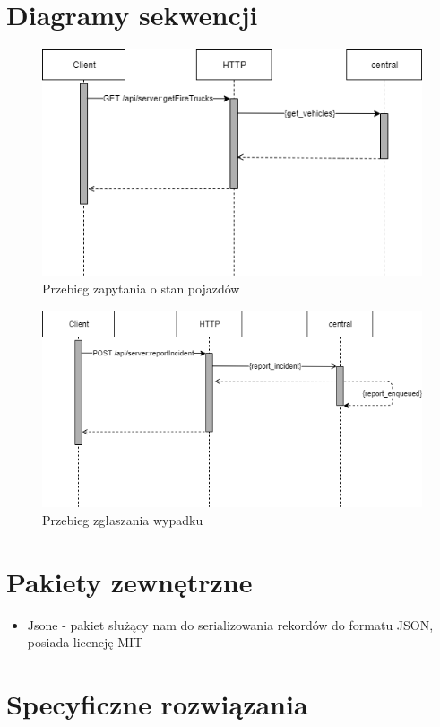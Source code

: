 \documentclass{article}
\begin{document}
\section{Diagramy sekwencji}
\begin{figure}[H]
	\includegraphics[width=.9\linewidth]{ChariotBase.png}
	\caption{Przebieg zapytania o stan pojazdów}
\end{figure}

\begin{figure}[H]
	\includegraphics[width=.9\linewidth]{ChariotCentral.png}
	\caption{Przebieg zgłaszania wypadku}
	
\end{figure}

\section{Pakiety zewnętrzne}
\begin{itemize}
	\item Jsone - pakiet służący nam do serializowania rekordów do formatu JSON, posiada licencję MIT
\end{itemize}

\section{Specyficzne rozwiązania}
\end{document}
